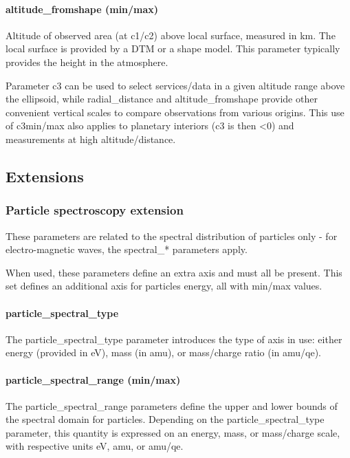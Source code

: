 \documentclass[11pt,a4paper]{ivoa}
\begin{document}
\paragraph{altitude\_fromshape (min/max)}

Altitude of observed area (at c1/c2) above local surface, measured in km. The local surface is provided by a DTM or a shape model. This parameter typically provides the height in the atmosphere.

Parameter c3 can be used to select services/data in a given altitude range above the ellipsoid, while radial\_distance and altitude\_fromshape provide other convenient vertical scales to compare observations from various origins. This use of c3min/max also applies to planetary interiors (c3 is then <0) and measurements at high altitude/distance. 

\subsection{Extensions}

\subsubsection{Particle spectroscopy extension}

These parameters are related to the spectral distribution of particles only - for electro-magnetic waves, the spectral\_* parameters apply.

When used, these parameters define an extra axis and must all be present. This set defines an additional axis for particles energy, all with min/max values.

\paragraph{particle\_spectral\_type}

The particle\_spectral\_type parameter introduces the type of axis in use: either energy (provided in eV), mass (in amu), or mass/charge ratio (in amu/qe).

\paragraph{particle\_spectral\_range (min/max)}

The particle\_spectral\_range parameters define the upper and lower bounds of the spectral domain for particles. Depending on the particle\_spectral\_type parameter, this quantity is expressed on an energy, mass, or mass/charge scale, with respective units eV, amu, or amu/qe.
\end{document}
